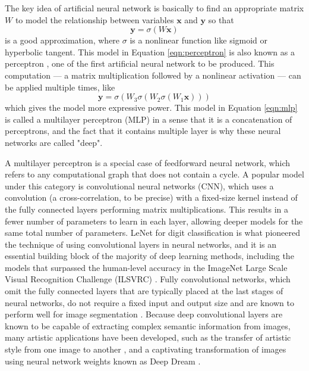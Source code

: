 The key idea of artificial neural network is basically to find an appropriate matrix $W$ to model the relationship between variables $\mathbf{x}$ and $\mathbf{y}$ so that
\begin{equation}\label{eqn:perceptron}
	\mathbf{y} = \sigma(W \mathbf{x})
\end{equation}
is a good approximation, where $\sigma$ is a nonlinear function like sigmoid or hyperbolic tangent. This model in Equation \ref{eqn:perceptron} is also known as a perceptron \cite{rosenblatt1957perceptron}, one of the first artificial neural network to be produced.
This computation --- a matrix multiplication followed by a nonlinear activation --- can be applied multiple times, like
\begin{equation}\label{eqn:mlp}
	\mathbf{y} = \sigma(W_3\sigma(W_2 \sigma(W_1 \mathbf{x})))
\end{equation}
which gives the model more expressive power.
This model in Equation \ref{eqn:mlp} is called a multilayer perceptron (MLP) in a sense that it is a concatenation of perceptrons, and the fact that it contains multiple layer is why these neural networks are called "deep".

A multilayer perceptron is a special case of feedforward neural network, which refers to any computational graph that does not contain a cycle. A popular model under this category is convolutional neural networks (CNN), which uses a convolution (a cross-correlation, to be precise) with a fixed-size kernel instead of the fully connected layers performing matrix multiplications.
This results in a fewer number of parameters to learn in each layer, allowing deeper models for the same total number of parameters.
LeNet \cite{lecun1995lenet} for digit classification is what pioneered the technique of using convolutional layers in neural networks, and it is an essential building block of the majority of deep learning methods, including the models that surpassed the human-level accuracy in the ImageNet Large Scale Visual Recognition Challenge (ILSVRC) \cite{krizhevsky2012imagenet, simonyan2014vgg, szegedy2015googlenet, he2016resnet}.
Fully convolutional networks, which omit the fully connected layers that are typically placed at the last stages of neural networks, do not require a fixed input and output size and are known to perform well for image segmentation \cite{shelhamer2017fcn}.
Because deep convolutional layers are known to be capable of extracting complex semantic information from images, many artistic applications have been developed, such as the transfer of artistic style from one image to another \cite{gatys2015style}, and a captivating transformation of images using neural network weights known as Deep Dream \cite{mahendran2016deepdream}.


